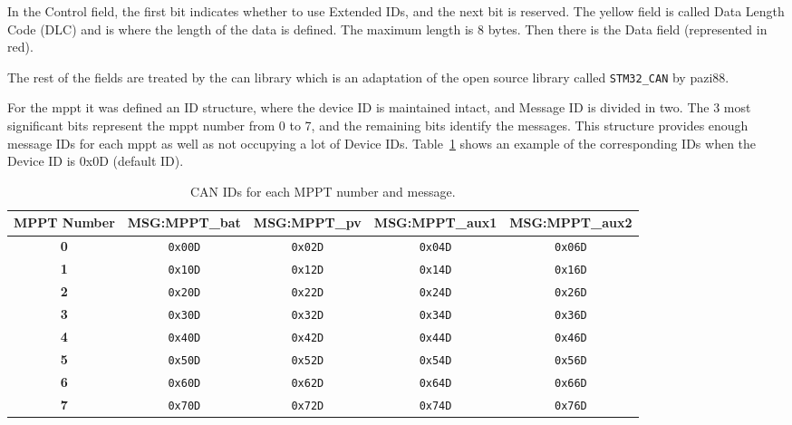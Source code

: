         In the Control field, the first bit indicates whether to use Extended IDs, and the next bit is reserved. The yellow field is called Data Length Code (DLC) and is where the length of the data is defined. The maximum length is 8 bytes. Then there is the Data field (represented in red). 

        The rest of the fields are treated by the \ac{can} library which is an adaptation of the open source library called \texttt{STM32\_CAN} by pazi88.

        For the \ac{mppt} it was defined an ID structure, where the device ID is maintained intact, and Message ID is divided in two. The 3 most significant bits represent the \ac{mppt} number from 0 to 7, and the remaining bits identify the messages. This structure provides enough message IDs for each \ac{mppt} as well as not occupying a lot of Device IDs. Table~\ref{tab:mppt_message_ids} shows an example of the corresponding IDs when the Device ID is 0x0D (default ID).

        \begin{table}[!ht]
            \caption{CAN IDs for each MPPT number and message.}
            \centering
            \begin{tabular}{|c|c|c|c|c|}
                \hline
                \textbf{MPPT Number} & \textbf{MSG:MPPT\_bat} & \textbf{MSG:MPPT\_pv} & \textbf{MSG:MPPT\_aux1} & \textbf{MSG:MPPT\_aux2} \\
                \hline
                \textbf{0} & \texttt{0x00D} & \texttt{0x02D} & \texttt{0x04D} & \texttt{0x06D} \\
                \hline
                \textbf{1} & \texttt{0x10D} & \texttt{0x12D} & \texttt{0x14D} & \texttt{0x16D} \\
                \hline
                \textbf{2} & \texttt{0x20D} & \texttt{0x22D} & \texttt{0x24D} & \texttt{0x26D} \\
                \hline
                \textbf{3} & \texttt{0x30D} & \texttt{0x32D} & \texttt{0x34D} & \texttt{0x36D} \\
                \hline
                \textbf{4} & \texttt{0x40D} & \texttt{0x42D} & \texttt{0x44D} & \texttt{0x46D} \\
                \hline
                \textbf{5} & \texttt{0x50D} & \texttt{0x52D} & \texttt{0x54D} & \texttt{0x56D} \\
                \hline
                \textbf{6} & \texttt{0x60D} & \texttt{0x62D} & \texttt{0x64D} & \texttt{0x66D} \\
                \hline
                \textbf{7} & \texttt{0x70D} & \texttt{0x72D} & \texttt{0x74D} & \texttt{0x76D} \\
                \hline
            \end{tabular}
            \label{tab:mppt_message_ids}
        \end{table}


